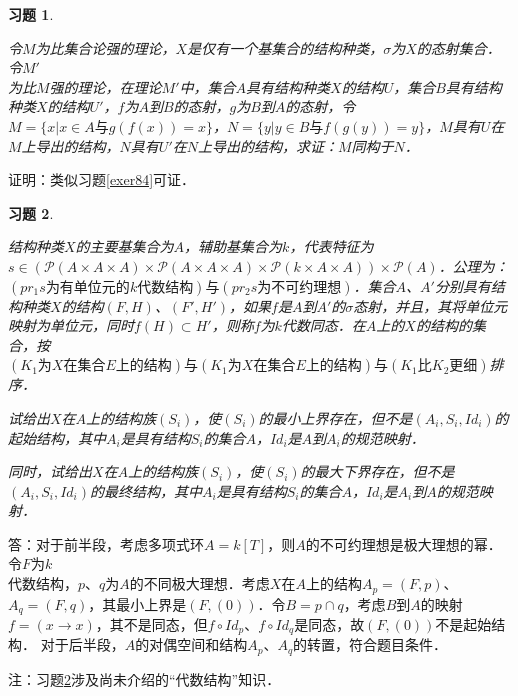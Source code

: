 \documentclass[12pt, a4paper, oneside]{book}
\newtheorem{exer}{习题}
\begin{document}
			\begin{exer}\label{exer203}
				\hfill\par
				令$M$为比集合论强的理论，$X$是仅有一个基集合的结构种类，$\sigma$为$X$的态射集合．令$M'$\\为比$M$强的理论，在理论$M'$中，集合$A$具有结构种类$X$的结构$U$，集合$B$具有结构种类$X$的结构$U'$，$f$为$A$到$B$的态射，$g$为$B$到$A$的态射，令$M=\{x|x\in A\text{与}g(f(x))=x\}$，$N=\{y|y\in B\text{与}f(g(y))=y\}$，$M$具有$U$在$M$上导出的结构，$N$具有$U'$在$N$上导出的结构，求证：$M$同构于$N$．
			\end{exer}
			证明：类似习题\ref{exer84}可证．
			
			\begin{exer}\label{exer204}
				\hfill\par
				结构种类$X$的主要基集合为$A$，辅助基集合为$k$，代表特征为$s\in (\mathcal{P}(A\times A\times A)\times \mathcal{P}(A\times A\times A)\times \mathcal{P}(k\times A\times A))\times \mathcal{P}(A)$．公理为：$(pr_1s\text{为有单位元的}k\text{代数结构})\text{与}(pr_2s\text{为不可约理想})$．集合$A$、$A'$分别具有结构种类$X$的结构$(F, H)$、$(F', H')$，如果$f$是$A$到$A'$的$\sigma$态射，并且，其将单位元映射为单位元，同时$f(H)\subset H'$，则称$f$为$k$代数同态．在$A$上的$X$的结构的集合，按$(K_1\text{为}X\text{在集合}E\text{上的结构})\text{与}(K_1\text{为}X\text{在集合}E\text{上的结构})\text{与}(K_1\text{比}K_2\text{更细})$排序．
				\par
				试给出$X$在$A$上的结构族$(S_i)$，使$(S_i)$的最小上界存在，但不是$(A_i, S_i, Id_i)$的起始结构，其中$A_i$是具有结构$S_i$的集合$A$，$Id_i$是$A$到$A_i$的规范映射．
				\par
				同时，试给出$X$在$A$上的结构族$(S_i)$，使$(S_i)$的最大下界存在，但不是$(A_i, S_i, Id_i)$的最终结构，其中$A_i$是具有结构$S_i$的集合$A$，$Id_i$是$A_i$到$A$的规范映射．
			\end{exer}
			答：对于前半段，考虑多项式环$A=k[T]$，则$A$的不可约理想是极大理想的幂．令$F$为$k$\\代数结构，$p$、$q$为$A$的不同极大理想．考虑$X$在$A$上的结构$A_p=(F, p)$、$A_q=(F, q)$，其最小上界是$(F, (0))$．令$B= p\cap q$，考虑$B$到$A$的映射$f=(x\to x)$，其不是同态，但$f\circ Id_p$、$f\circ Id_q$是同态，故$(F, (0))$不是起始结构．
			对于后半段，$A$的对偶空间和结构$A_p$、$A_q$的转置，符合题目条件．
			\par
			注：习题\ref{exer204}涉及尚未介绍的“代数结构”知识．
			
\end{document}
